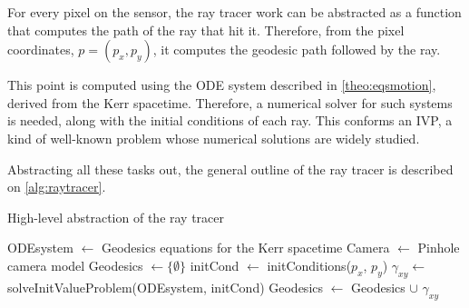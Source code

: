For every pixel on the sensor, the ray tracer work can be abstracted as a function that computes the path of the ray that hit it. Therefore, from the pixel coordinates, $p = (p_x, p_y)$, it computes the geodesic path followed by the ray.

This point is computed using the \ac{ODE} system described in \autoref{theo:eqsmotion}, derived from the Kerr spacetime. Therefore, a numerical solver for such systems is needed, along with the initial conditions of each ray. This conforms an \ac{IVP}, a kind of well-known problem whose numerical solutions are widely studied.

Abstracting all these tasks out, the general outline of the ray tracer is described on \autoref{alg:raytracer}.

\begin{algorithm}
	\caption{High-level abstraction of the ray tracer}
	\label{alg:raytracer}
	\begin{algorithmic}[1]
		\State ODEsystem $\gets$ Geodesics equations for the Kerr spacetime
		\State Camera $\gets$ Pinhole camera model
		\State Geodesics $\gets \{\emptyset\}$
		\State initCond $\gets$ initConditions($p_x$, $p_y$)
		\State $\gamma_{xy} \gets$ solveInitValueProblem(ODEsystem, initCond)
		\State Geodesics $\gets$ Geodesics $\cup$ $\gamma_{xy}$
		\EndFor
		\EndFunction
	\end{algorithmic}
\end{algorithm}

